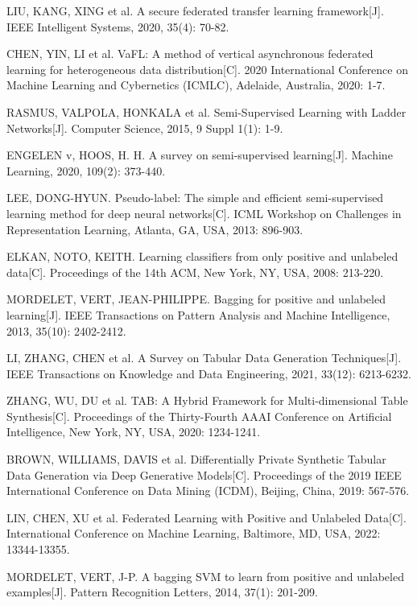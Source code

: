 \begin{thebibliography}{200}
	LIU, KANG, XING et al. A secure federated transfer learning framework[J]. IEEE Intelligent Systems, 2020, 35(4): 70-82.

	CHEN, YIN, LI et al. VaFL: A method of vertical asynchronous federated learning for heterogeneous data distribution[C]. 2020 International Conference on Machine Learning and Cybernetics (ICMLC), Adelaide, Australia, 2020: 1-7.

	RASMUS, VALPOLA, HONKALA et al. Semi-Supervised Learning with Ladder Networks[J]. Computer Science, 2015, 9 Suppl 1(1): 1-9.

	ENGELEN v, HOOS, H. H. A survey on semi-supervised learning[J]. Machine Learning, 2020, 109(2): 373-440.

	LEE, DONG-HYUN. Pseudo-label: The simple and efficient semi-supervised learning method for deep neural networks[C]. ICML Workshop on Challenges in Representation Learning, Atlanta, GA, USA, 2013: 896-903.

	ELKAN, NOTO, KEITH. Learning classifiers from only positive and unlabeled data[C]. Proceedings of the 14th ACM, New York, NY, USA, 2008: 213-220.

	MORDELET, VERT, JEAN-PHILIPPE. Bagging for positive and unlabeled learning[J]. IEEE Transactions on Pattern Analysis and Machine Intelligence, 2013, 35(10): 2402-2412.

	LI, ZHANG, CHEN et al. A Survey on Tabular Data Generation Techniques[J]. IEEE Transactions on Knowledge and Data Engineering, 2021, 33(12): 6213-6232.

	ZHANG, WU, DU et al. TAB: A Hybrid Framework for Multi-dimensional Table Synthesis[C]. Proceedings of the Thirty-Fourth AAAI Conference on Artificial Intelligence, New York, NY, USA, 2020: 1234-1241.

	BROWN, WILLIAMS, DAVIS et al. Differentially Private Synthetic Tabular Data Generation via Deep Generative Models[C]. Proceedings of the 2019 IEEE International Conference on Data Mining (ICDM), Beijing, China, 2019: 567-576.

	LIN, CHEN, XU et al. Federated Learning with Positive and Unlabeled Data[C]. International Conference on Machine Learning, Baltimore, MD, USA, 2022: 13344-13355.

	MORDELET, VERT, J-P. A bagging SVM to learn from positive and unlabeled examples[J]. Pattern Recognition Letters, 2014, 37(1): 201-209.


\end{thebibliography}

